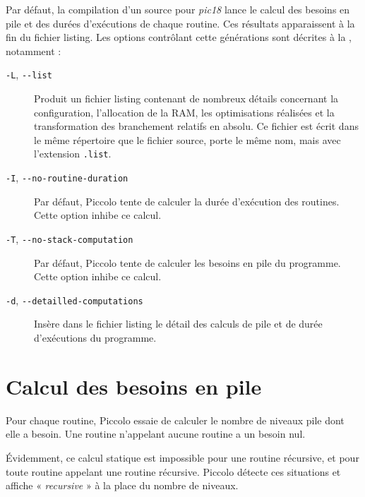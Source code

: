 
\cleardoublepage


\thispagestyle{empty}

Par défaut, la compilation d'un source pour \emph{pic18} lance le calcul des besoins en pile et des durées d'exécutions de chaque routine. Ces résultats apparaissent à la fin du fichier listing. Les options contrôlant cette générations sont décrites à la , notamment :
\begin{description}

  \item[\texttt{-L}, \texttt{-{-}list}] Produit un fichier listing contenant de nombreux détails concernant la configuration, l’allocation de la RAM, les optimisations réalisées et la transformation des branchement relatifs en absolu. Ce fichier est écrit dans le même répertoire que le fichier source, porte le même nom, mais avec l’extension \texttt{.list}.

  \item[\texttt{-I}, \texttt{-{-}no-routine-duration}] Par défaut, Piccolo tente de calculer la durée d'exécution des routines. Cette option inhibe ce calcul.

  \item[\texttt{-T}, \texttt{-{-}no-stack-computation}] Par défaut, Piccolo tente de calculer les besoins en pile du programme. Cette option inhibe ce calcul.

  \item[\texttt{-d}, \texttt{-{-}detailled-computations}] Insère dans le fichier listing le détail des calculs de pile et de durée d'exécutions du programme.
\end{description}

\section{Calcul des besoins en pile}

Pour chaque routine, Piccolo essaie de calculer le nombre de niveaux pile dont elle a besoin. Une routine n'appelant aucune routine a un besoin nul.

Évidemment, ce calcul statique est impossible pour une routine récursive, et pour toute routine appelant une routine récursive. Piccolo détecte ces situations et affiche « \emph{recursive} » à la place du nombre de niveaux. 

